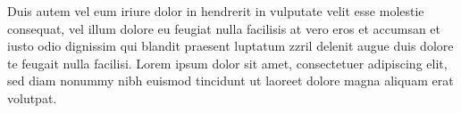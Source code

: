 Duis autem vel eum iriure dolor in hendrerit in vulputate velit esse molestie consequat, vel illum dolore eu feugiat nulla facilisis at vero eros et accumsan et iusto odio dignissim qui blandit praesent luptatum zzril delenit augue duis dolore te feugait nulla facilisi. Lorem ipsum dolor sit amet, consectetuer adipiscing elit, sed diam nonummy nibh euismod tincidunt ut laoreet dolore magna aliquam erat volutpat.   






